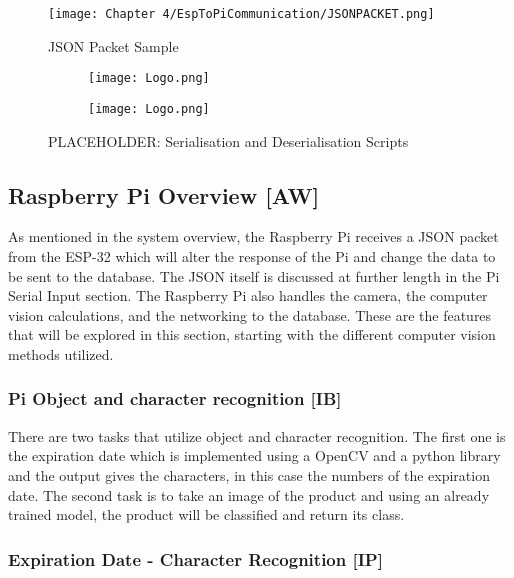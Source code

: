 \begin{figure}[H]        
    \centering
    \texttt{[image: Chapter 4/EspToPiCommunication/JSONPACKET.png]}
    \caption{JSON Packet Sample}
\end{figure} 

\begin{figure}[H]
    \begin{subfigure}{.5\textwidth}
      \centering
      \texttt{[image: Logo.png]}
    \end{subfigure}%
    \begin{subfigure}{.5\textwidth}
      \centering
      \texttt{[image: Logo.png]}
    \end{subfigure}
    \caption{PLACEHOLDER: Serialisation and Deserialisation Scripts}
\end{figure}

\subsection{Raspberry Pi Overview [AW]}

As mentioned in the system overview, the Raspberry Pi receives a JSON packet from the ESP-32 which will alter the response of the Pi and change the data to be sent to the database.
The JSON itself is discussed at further length in the Pi Serial Input section.
The Raspberry Pi also handles the camera, the computer vision calculations, and the networking to the database.
These are the features that will be explored in this section, starting with the different computer vision methods utilized.

\subsubsection{Pi Object and character recognition [IB]}

There are two tasks that utilize object and character recognition.
The first one is the expiration date which is implemented using a OpenCV and a python library and the output gives the characters, in this case the numbers of the expiration date.
The second task is to take an image of the product and using an already trained model, the product will be classified and return its class.
	

\subsubsection{Expiration Date - Character Recognition [IP]}

